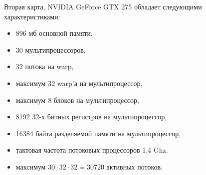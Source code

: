 Вторая карта, NVIDIA GeForce GTX 275 обладает следующими характеристиками:
 \begin{itemize}
\item 896 мб основной памяти,
\item 30 мультипроцессоров,
\item 32 потока на warp,
\item максимум 32 warp'а на мультипроцессор,
\item максимум 8 блоков на мультипроцессор,
\item 8192 32-х битных регистров на мультипроцессор,
\item 16384 байта разделяемой памяти на мультипроцессор,
\item тактовая частота потоковых процессоров 1.4 Ghz.
\item максимум $30 \cdot 32\cdot 32 = 30720$ активных потоков.
 \end{itemize}
